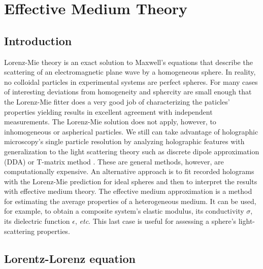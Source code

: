 \chapter{Effective Medium Theory}
\label{ch:EMT}

\section{Introduction}

Lorenz-Mie theory is an exact solution to Maxwell's equations that describe the scattering of an electromagnetic plane wave by a homogeneous sphere. 
In reality, no colloidal particles in experimental systems are perfect spheres. 
For many cases of interesting deviations from homogeneity and sphercity are small enough that the Lorenz-Mie fitter does a very good job of characterizing the paticles' properties yielding results in excellent agreement with independent measurements. The Lorenz-Mie solution does not apply, however, to inhomogeneous or aspherical particles. 
We still can take advantage of holographic microscopy's single particle resolution by analyzing holographic features with generalization to the light scattering theory such as  discrete dipole approximation (DDA) \cite{draine94} or T-matrix method \cite{mishchenko96,waterman65}. 
These are general methods, however, are computationally expensive. 
An alternative approach is to fit recorded holograms with the Lorenz-Mie prediction for ideal spheres and then to interpret the results with effective medium theory. 
The effective medium approximation is a method for estimating the average properties of a heterogeneous medium. It can be used, for example, to obtain a composite system's elastic modulus, its conductivity $\sigma$,  its dielectric function $\epsilon$, \textit{etc}. This last case is useful for assessing a sphere's light-scattering properties.

\section{Lorentz-Lorenz equation}
\label{sec:ll}

